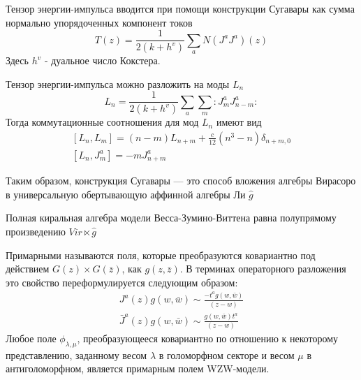 \documentclass[a4paper,12pt]{article}
\theoremstyle{definition} \newtheorem{Def}{Definition}
\begin{document}
Тензор энергии-импульса вводится при помощи конструкции Сугавары как сумма нормально упорядоченных компонент токов
\begin{equation}
  \label{eq:102}
  T(z)=\frac{1}{2(k+h^v)}\sum_a N(J^a J^a)(z)
\end{equation}
Здесь $h^v$ - дуальное число Кокстера.

Тензор энергии-импульса можно разложить на моды $L_n$
\begin{equation}
  \label{eq:91}
  L_n=\frac{1}{2(k+h^v)}\sum_a\sum_m:J^a_m J^a_{n-m}:
\end{equation}
Тогда коммутационные соотношения для мод $L_n$ имеют вид
\begin{equation}
  \label{eq:92}
  \begin{aligned}
    \left[L_n,L_m\right]=(n-m)L_{n+m}+\frac{c}{12}(n^3-n)\delta_{n+m,0}\\
    \left[L_n,J^a_m\right]=-mJ^a_{n+m}
  \end{aligned}
\end{equation}

Таким образом, конструкция Сугавары --- это способ вложения алгебры Вирасоро в универсальную обертывающую аффинной алгебры Ли $\hat{g}$

Полная киральная алгебра модели Весса-Зумино-Виттена равна полупрямому произведению $Vir\ltimes \hat g$

Примарными называются поля, которые преобразуются ковариантно под действием $G(z)\times G(\bar z)$, как $g(z,\bar z)$. В терминах операторного разложения это свойство переформулируется следующим образом:
\begin{equation}
  \label{eq:84}
  \begin{aligned}
    J^a(z)g(w,\bar w)\sim \frac{-t^a g(w,\bar w)}{(z-w)}\\
    \bar J^a(z)g(w,\bar w)\sim \frac{ g(w,\bar w)t^a}{(z-w)}
  \end{aligned}
\end{equation}
Любое поле $\phi_{\lambda,\mu}$, преобразующееся ковариантно по отношению к некоторому представлению, заданному весом $\lambda$ в голоморфном секторе и весом $\mu$ в антиголоморфном, является примарным полем WZW-модели.
\end{document}
